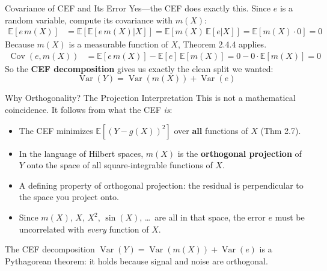 \documentclass[aspectratio=169]{beamer}
\numberwithin{equation}{section}
\begin{document}
\begin{frame}{Covariance of CEF and Its Error}
Yes---the CEF does exactly this.  Since $e$ is a random variable, compute its covariance with $m(X)$:
\begin{align*}
\mathbb{E}[e\, m(X)] & =  \mathbb{E}[\mathbb{E}[e\, m(X)|X]]=\mathbb{E}[m(X)\,\mathbb{E}[e|X]]=\mathbb{E}[m(X)\cdot 0]=0
\end{align*}\pause
Because $m(X)$ is a measurable function of $X$, Theorem 2.4.4 applies.\pause
\begin{align*}
\operatorname{Cov}(e , m(X)) & =  \mathbb{E}[e\, m(X)]- \mathbb{E}[e]\,\mathbb{E}[m(X)]=0- 0\cdot\mathbb{E}[m(X)]=0
\end{align*}\pause
So the \textbf{CEF decomposition} gives us exactly the clean split we wanted:
$$\operatorname{Var}(Y)=\operatorname{Var}(m(X))+\operatorname{Var}(e)$$
\end{frame}

\begin{frame}{Why Orthogonality? The Projection Interpretation}
This is not a mathematical coincidence.  It follows from what the CEF \emph{is}:

\begin{itemize}
\item The CEF minimizes $\mathbb{E}[(Y - g(X))^2]$ over \textbf{all} functions of $X$ (Thm 2.7).
\item In the language of Hilbert spaces, $m(X)$ is the \textbf{orthogonal projection} of $Y$ onto the space of all square-integrable functions of $X$.
\pause
\item A defining property of orthogonal projection: \alert{the residual is perpendicular to the space you project onto}.
\pause
\item Since $m(X)$, $X$, $X^2$, $\sin(X)$, \ldots\ are all in that space, the error $e$ must be uncorrelated with \emph{every} function of $X$.
\end{itemize}
\pause
\medskip
\begin{tcolorbox}[colback=blue!5, colframe=blue!50]
The CEF decomposition $\operatorname{Var}(Y)=\operatorname{Var}(m(X))+\operatorname{Var}(e)$ is a Pythagorean theorem: it holds because signal and noise are orthogonal.
\end{tcolorbox}
\end{frame}
\end{document}
